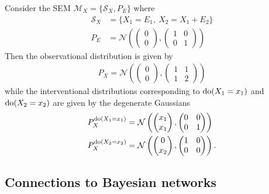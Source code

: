 \begin{example}\label{example:causality-simple-sem}
Consider the SEM $\mathcal{M}_X=\{\mathcal{S}_X, P_E\}$ where
%
\begin{align*}
\mathcal{S}_X &= \big\{  X_1 = E_1,\ X_2 = X_1 + E_2\big\} \\
P_E &= \mathcal{N}\left(\begin{pmatrix}
0 \\
0 
\end{pmatrix}, 
\begin{pmatrix}
1 & 0 \\
0 & 1
\end{pmatrix}\right)
\end{align*}
%
Then the observational distribution is given by 
%
\begin{align*}
P_X = \mathcal{N}\left(\begin{pmatrix}
0 \\
0 
\end{pmatrix}, 
\begin{pmatrix}
1 & 1 \\
1 & 2
\end{pmatrix}\right)
\end{align*}
%
while the interventional distributions corresponding to $\operatorname{do}(X_1 = x_1)$ and $\operatorname{do}(X_2 = x_2)$ are given by the degenerate Gaussians
%
\begin{align*}
P^{\operatorname{do}(X_1 = x_1)}_X &= \mathcal{N}\left(\begin{pmatrix}
x_1 \\
x_1 
\end{pmatrix}, 
\begin{pmatrix}
0 & 0 \\
0 & 1
\end{pmatrix}\right) \\
P^{\operatorname{do}(X_2 = x_2)}_X &= \mathcal{N}\left(\begin{pmatrix}
0 \\
x_2 
\end{pmatrix}, 
\begin{pmatrix}
1 & 0 \\
0 & 0
\end{pmatrix}\right).
\end{align*}
\end{example}

\subsection{Connections to Bayesian networks}


